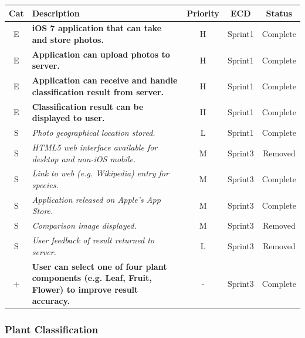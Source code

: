 \documentclass[a4paper,11pt]{article}
\begin{document}
\begin{table}[H]
\small
\centering
\begin{tabular}{ c p{11cm} c c c }
  Cat & Description & Priority & ECD & Status\\
  \hline
  E & \textbf{iOS 7 application that can take and store photos.} & H & Sprint1 & Complete\\
  E & \textbf{Application can upload photos to server.} & H  & Sprint1 & Complete \\
  E & \textbf{Application can receive and handle classification result from server.} & H & Sprint1 & Complete\\
  E & \textbf{Classification result can be displayed to user.} & H & Sprint1 & Complete \\
  S & \textit{Photo geographical location stored.} & L & Sprint1 & Complete \\  
  S & \textit{HTML5 web interface available for desktop and non-iOS mobile.} & M & Sprint3 & Removed\\
  S & \textit{Link to web (e.g. Wikipedia) entry for species.} & M  & Sprint3 & Complete\\
  S & \textit{Application released on Apple's App Store.} & M & Sprint3 & Complete \\
  S & \textit{Comparison image displayed.} & M & Sprint3 & Removed \\
  S & \textit{User feedback of result returned to server.} & L & Sprint3 & Removed \\
  \hdashline
  $+$ & \textbf{User can select one of four plant components (e.g. Leaf, Fruit, Flower) to improve result accuracy.} & - & Sprint3 & Complete \\
\end{tabular}
\end{table}

\subsubsection{Plant Classification}
\end{document}
